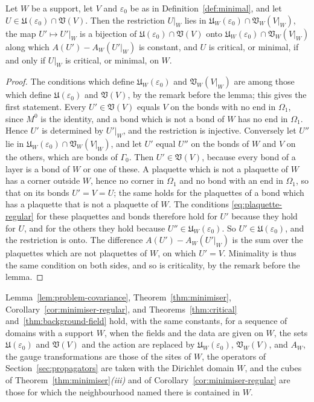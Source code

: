 \documentclass[11pt]{preprint}
\numberwithin{equation}{section}
\begin{document}
\begin{lemma}\label{lem:support}
Let $W$ be a support, let $V$ and $\varepsilon_0$ be as in Definition~\ref{def:minimal}, and let $U \in \mathfrak U(\varepsilon_0) \cap \mathfrak V(V)$. Then the restriction $U|_W$ lies in $\mathfrak U_W(\varepsilon_0) \cap \mathfrak V_W(V|_W)$, the map $U' \mapsto U'|_W$ is a bijection of $\mathfrak U(\varepsilon_0) \cap \mathfrak V(V)$ onto $\mathfrak U_W(\varepsilon_0) \cap \mathfrak V_W(V|_W)$ along which $A(U') - A_W(U'|_W)$ is constant, and $U$ is critical, or minimal, if and only if $U|_W$ is critical, or minimal, on $W$.
\end{lemma}

\begin{proof}
The conditions which define $\mathfrak U_W(\varepsilon_0)$ and $\mathfrak V_W(V|_W)$ are among those which define $\mathfrak U(\varepsilon_0)$ and $\mathfrak V(V)$, by the remark before the lemma; this gives the first statement. Every $U' \in \mathfrak V(V)$ equals $V$ on the bonds with no end in $\Omega_1$, since $M^0$ is the identity, and a bond which is not a bond of $W$ has no end in $\Omega_1$. Hence $U'$ is determined by $U'|_W$, and the restriction is injective. Conversely let $U''$ lie in $\mathfrak U_W(\varepsilon_0) \cap \mathfrak V_W(V|_W)$, and let $U'$ equal $U''$ on the bonds of $W$ and $V$ on the others, which are bonds of $\Gamma_0$. Then $U' \in \mathfrak V(V)$, because every bond of a layer is a bond of $W$ or one of these. A plaquette which is not a plaquette of $W$ has a corner outside $W$, hence no corner in $\Omega_1$ and no bond with an end in $\Omega_1$, so that on its bonds $U' = V = U$; the same holds for the plaquettes of a bond which has a plaquette that is not a plaquette of $W$. The conditions \eqref{eq:plaquette-regular} for these plaquettes and bonds therefore hold for $U'$ because they hold for $U$, and for the others they hold because $U'' \in \mathfrak U_W(\varepsilon_0)$. So $U' \in \mathfrak U(\varepsilon_0)$, and the restriction is onto. The difference $A(U') - A_W(U'|_W)$ is the sum over the plaquettes which are not plaquettes of $W$, on which $U' = V$. Minimality is thus the same condition on both sides, and so is criticality, by the remark before the lemma.
\end{proof}

\begin{theorem}\label{thm:support}
Lemma~\ref{lem:problem-covariance}, Theorem~\ref{thm:minimiser}, Corollary~\ref{cor:minimiser-regular}, and Theorems~\ref{thm:critical} and~\ref{thm:background-field} hold, with the same constants, for a sequence of domains with a support $W$, when the fields and the data are given on $W$, the sets $\mathfrak U(\varepsilon_0)$ and $\mathfrak V(V)$ and the action are replaced by $\mathfrak U_W(\varepsilon_0)$, $\mathfrak V_W(V)$, and $A_W$, the gauge transformations are those of the sites of $W$, the operators of Section~\ref{sec:propagators} are taken with the Dirichlet domain $W$, and the cubes of Theorem~\ref{thm:minimiser}\emph{(iii)} and of Corollary~\ref{cor:minimiser-regular} are those for which the neighbourhood named there is contained in $W$.
\end{theorem}
\end{document}
